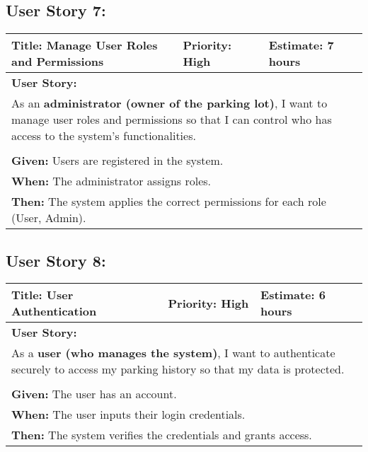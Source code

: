 \newpage

\subsection{User Story 7:}
\begin{table}[H]
    \centering
    \begin{tabular}{|p{}|p{}|p{}|}
        \hline
        \rowcolor{lightblue}
        \textbf{Title: Manage User Roles and Permissions} & \textbf{Priority: High} & \textbf{Estimate: 7 hours} \\
        \hline
        \multicolumn{3}{|l|}{\textbf{User Story:}} \\
        \multicolumn{3}{|p{15cm}|}{As an \textbf{administrator (owner of the parking lot)}, I want to manage user roles and permissions so that I can control who has access to the system's functionalities.} \\
        \hline
        \rowcolor{lightblue}
        \multicolumn{3}{|c|}{\textbf{Acceptance Criteria:}} \\
        \hline
        \multicolumn{3}{|l|}{\textbf{Given:} Users are registered in the system.} \\
        \multicolumn{3}{|l|}{\textbf{When:} The administrator assigns roles.} \\
        \multicolumn{3}{|l|}{\textbf{Then:} The system applies the correct permissions for each role (User, Admin).} \\
        \hline
    \end{tabular}
\end{table}

\subsection{User Story 8:}
\begin{table}[H]
    \centering
    \begin{tabular}{|p{}|p{}|p{}|}
        \hline
        \rowcolor{lightblue}
        \textbf{Title: User Authentication} & \textbf{Priority: High} & \textbf{Estimate: 6 hours} \\
        \hline
        \multicolumn{3}{|l|}{\textbf{User Story:}} \\
        \multicolumn{3}{|p{15cm}|}{As a \textbf{user (who manages the system)}, I want to authenticate securely to access my parking history so that my data is protected.} \\
        \hline
        \rowcolor{lightblue}
        \multicolumn{3}{|c|}{\textbf{Acceptance Criteria:}} \\
        \hline
        \multicolumn{3}{|l|}{\textbf{Given:} The user has an account.} \\
        \multicolumn{3}{|l|}{\textbf{When:} The user inputs their login credentials.} \\
        \multicolumn{3}{|l|}{\textbf{Then:} The system verifies the credentials and grants access.} \\
        \hline
    \end{tabular}
\end{table}

